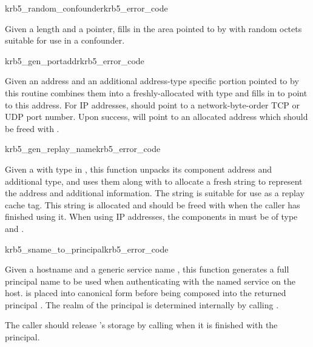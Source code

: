 \begin{funcdecl}{krb5_random_confounder}{krb5_error_code}{\funcin}
\funcout
{}
\end{funcdecl}

Given a length and a pointer, fills in the area pointed to by
 with  random octets suitable for use
in a confounder.

\begin{funcdecl}{krb5_gen_portaddr}{krb5_error_code}{\funcin}
\funcout
{}
\end{funcdecl}

Given an address  and an additional address-type specific
portion pointed to by
 this routine
combines them into a freshly-allocated
 with type  and fills in
 to point to this address.  For IP addresses,
 should point to a network-byte-order TCP or UDP port
number.  Upon success,  will point to an allocated
address which should be freed with .

\begin{funcdecl}{krb5_gen_replay_name}{krb5_error_code}{\funcin}
\funcout
{}
\end{funcdecl}

Given a  with type 
in , this function unpacks its component address and
additional type, and uses them along with  to allocate a
fresh string to represent the address and additional information.  The
string is suitable for use as a replay cache tag.  This string is
allocated and should be freed with  when the caller has
finished using it.  When using IP addresses, the components in
 must be of type
 and .

\begin{funcdecl}{krb5_sname_to_principal}{krb5_error_code}{\funcin}
\funcout
{}
\end{funcdecl}

Given a hostname  and a generic service name
, this function generates a full principal name to be
used when authenticating with the named service on the host.
 is placed into canonical form before being composed
into the returned principal .  The realm of the
principal is determined internally by calling .

The caller should release 's storage by calling
 when it is finished with the principal.
